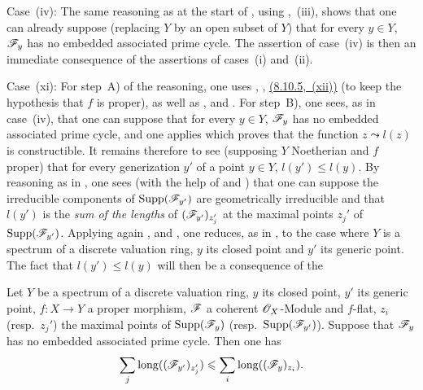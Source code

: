 \begin{env}[12.2.1.2]
\label{IV.12.2.1.2}
Case~(iv): The same reasoning as at the start of , using ,~(iii), shows that one can already suppose (replacing $Y$ by an open subset of $Y$) that for every $y\in Y$, $\mathscr{F}_y$ has no embedded associated prime cycle.
The assertion of case~(iv) is then an immediate consequence of the assertions of cases~(i) and~(ii).
\end{env}

\begin{env}[12.2.1.3]
\label{IV.12.2.1.3}
Case~(xi): For step~A) of the reasoning, one uses , , {\hyperref[IV.8.10.5]{(8.10.5,~(xii))}} (to keep the hypothesis that $f$ is proper), as well as ,  and .
For step~B), one sees, as in case~(iv), that one can suppose that for every $y\in Y$, $\mathscr{F}_y$ has no embedded associated prime cycle, and one applies  which proves that the function $z\leadsto l(z)$ is constructible.
It remains therefore to see (supposing $Y$ Noetherian and $f$ proper) that for every generization $y'$ of a point $y\in Y$, $l(y')\leqslant l(y)$.
By reasoning as in , one sees (with the help of  and ) that one can suppose the irreducible components of $\operatorname{Supp}(\mathscr{F}_{y'})$ are geometrically irreducible and that $l(y')$ is the \emph{sum of the lengths} of $(\mathscr{F}_{y'})_{z_j'}$ at the maximal points $z_j'$ of $\operatorname{Supp}(\mathscr{F}_{y'})$.
Applying again ,  and , one reduces, as in , to the case where $Y$ is a spectrum of a discrete valuation ring, $y$ its closed point and $y'$ its generic point.
The fact that $l(y')\leqslant l(y)$ will then be a consequence of the

\begin{lemma}[12.2.1.4]
\label{IV.12.2.1.4}
Let $Y$ be a spectrum of a discrete valuation ring, $y$ its closed point, $y'$ its generic point, $f:X\to Y$ a proper morphism, $\mathscr{F}$ a coherent $\mathscr{O}_X$-Module and $f$-flat, $z_i$ \textup{(resp.\ $z_j'$)} the maximal points of $\operatorname{Supp}(\mathscr{F}_y)$ \textup{(resp.\ $\operatorname{Supp}(\mathscr{F}_{y'})$)}.
Suppose that $\mathscr{F}_y$ has no embedded associated prime cycle.
Then one has
\[
  \sum_j \operatorname{long}((\mathscr{F}_{y'})_{z_j'}) \leqslant \sum_i \operatorname{long}((\mathscr{F}_y)_{z_i}).
\]
\end{lemma}


\end{env}
